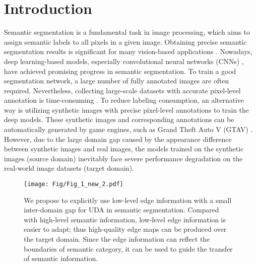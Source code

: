 \documentclass[sigconf]{acmart}
\begin{document}



\maketitle

\section{Introduction}
\par Semantic segmentation is a fundamental task in image processing, which aims to assign semantic labels to all pixels in a given image. Obtaining precise semantic segmentation results is significant for many vision-based applications \cite{zhang2016instance,wang2016temporal,xu2020march,pham2000current,Wu2021,Chen2019a}. Nowadays, deep learning-based models, especially convolutional neural networks (CNNs) \cite{lecun1998gradient,krizhevsky2012imagenet}, have achieved promising progress in semantic segmentation. To train a good segmentation network, a large number of fully annotated images are often required. Nevertheless, collecting large-scale datasets with accurate pixel-level annotation is time-consuming \cite{cordts2016cityscapes}. To reduce labeling consumption, an alternative way is utilizing synthetic images with precise pixel-level annotations to train the deep models. These synthetic images and corresponding annotations can be automatically generated by game engines, such as Grand Theft Auto V (GTAV) \cite{richter2016playing}. However, due to the large domain gap caused by the appearance difference between synthetic images and real images, the models trained on the synthetic images (source domain) inevitably face severe performance degradation on the real-world image datasets (target domain). 

\begin{figure}[!t]
    \centering
    \texttt{[image: Fig/Fig\_1\_new\_2.pdf]}
    \caption{We propose to explicitly use low-level edge information with a small inter-domain gap for UDA in semantic segmentation. Compared with high-level semantic information, low-level edge information is easier to adapt; thus high-quality edge maps can be produced over the target domain. Since the edge information can reflect the boundaries of semantic category, it can be used to guide the transfer of semantic information.}
    \label{fig:1}
\end{figure}
\end{document}
